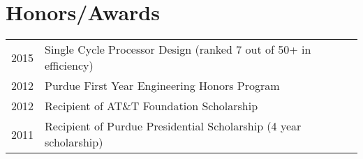 \documentclass[letterpaper]{deedy-resume} %
\begin{document}
\begin{minipage}[t]{0.66\textwidth}

\section{Honors/Awards} 

\begin{tabular}{rll}
2015 & Single Cycle Processor Design (ranked 7 out of 50+ in efficiency) \\
2012 & Purdue First Year Engineering Honors Program \\
2012 & Recipient of AT\&T Foundation Scholarship \\
2011 & Recipient of Purdue Presidential Scholarship (4 year scholarship) \\
\end{tabular}

\sectionspace %







\end{minipage} %




\end{document}
